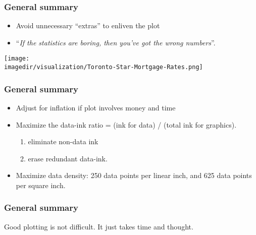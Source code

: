 \begin{frame}\frametitle{General summary}
	\begin{itemize}
		\item	Avoid unnecessary ``extras'' to enliven the plot 
		\item	``\emph{If the statistics are boring, then you've got the wrong numbers}''. 
	\end{itemize}
	\begin{center}
		\texttt{[image: \\imagedir/visualization/Toronto-Star-Mortgage-Rates.png]}
	\end{center}
\end{frame}

\begin{frame}\frametitle{General summary}
	\begin{itemize}
		\item	Adjust for inflation if plot involves money and time 
		\item	Maximize the data-ink ratio = (ink for data) / (total ink for graphics). 
		\begin{enumerate}
			\item	eliminate non-data ink 
			\item	erase redundant data-ink. 
		\end{enumerate}
		\item	Maximize data density: 250 data points per linear inch, and 625 data points per square inch. 
	\end{itemize}
\end{frame}

\begin{frame}\frametitle{General summary}
	Good plotting is not difficult. It just takes time and thought.
\end{frame}